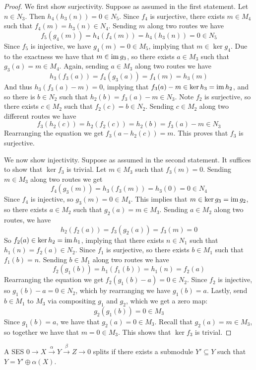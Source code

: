 \begin{proof}
    We first show surjectivity. Suppose as assumed in the first statement. Let $n\in N_3$. Then $h_4(h_3(n))=0\in N_5$. Since $f_4$ is surjective, there exists $m\in M_4$ such that $f_4(m)=h_3(n)\in N_4$. Sending $m$ along two routes we have
    \[f_5(g_4(m)) = h_4(f_4(m)) = h_4(h_3(n)) = 0\in N_5 \]
    Since $f_5$ is injective, we have $g_4(m)=0\in M_5$, implying that $m\in \ker g_4$. Due to the exactness we have that $m\in \operatorname{im} g_3$, so there exists $a\in M_3$ such that $g_3(a)=m\in M_4$. Again, sending $a\in M_3$ along two routes we have
    \[h_3(f_3(a)) = f_4(g_3(a)) = f_4(m)=h_3(m)\]
    And thus $h_3(f_3(a)-m)=0$, implying that $f_3(a)-m\in \ker h_3 = \operatorname{im} h_2$, and so there is $b\in N_2$ such that $h_2(b)=f_3(a)-m\in N_3$. Note $f_2$ is surjective, so there exists $c\in M_2$ such that $f_2(c)=b\in N_2$. Sending $c\in M_2$ along two different routes we have
    \[f_3(h_2(c)) = h_2(f_2(c)) = h_2(b) = f_3(a)-m \in N_3\]
    Rearranging the equation we get $f_3(a-h_2(c))=m$. This proves that $f_3$ is surjective.

    We now show injectivity. Suppose as assumed in the second statement. It suffices to show that $\ker f_3$ is trivial. Let $m\in M_3$ such that $f_3(m)=0$. Sending $m\in M_3$ along two routes we get 
    \[f_4(g_3(m)) = h_3(f_3(m)) = h_3(0) = 0\in N_4\]
    Since $f_4$ is injective, so $g_3(m)=0\in M_4$. This implies that $m\in \ker g_3 = \operatorname{im} g_2$, so there exists $a\in M_2$ such that $g_2(a)=m\in M_3$. Sending $a\in M_2$ along two routes, we have
    \[h_2(f_2(a)) = f_3(g_2(a)) = f_3(m) = 0\]
    So $f_2(a)\in \ker h_2 = \operatorname{im} h_1$, implying that there exists $n\in N_1$ such that $h_1(n) = f_2(a)\in N_2$. Since $f_1$ is surjective, so there exists $b\in M_1$ such that $f_1(b) = n$. Sending $b\in M_1$ along two routes we have
    \[f_2(g_1(b)) = h_1(f_1(b)) = h_1(n) = f_2(a)\]
    Rearranging the equation we get $f_2(g_1(b)-a) = 0\in N_2$. Since $f_2$ is injective, so $g_1(b)-a = 0\in N_2$, which by rearranging we have $g_1(b)=a$. Lastly, send $b\in M_1$ to $M_3$ via compositing $g_1$ and $g_2$, which we get a zero map:
    \[g_2(g_1(b)) = 0\in M_3\]
    Since $g_1(b)=a$, we have that $g_2(a) = 0\in M_3$. Recall that $g_2(a)=m\in M_3$, so together we have that $m=0\in M_3$. This shows that $\ker f_3$ is trivial.
\end{proof}

\begin{defn} 
    A SES $0\to X\xrightarrow{\alpha}Y\xrightarrow{\beta}Z\to 0$ splits if there exists a submodule $Y'\subseteq Y$ such that $Y= Y'\oplus \alpha(X)$.
\end{defn}

